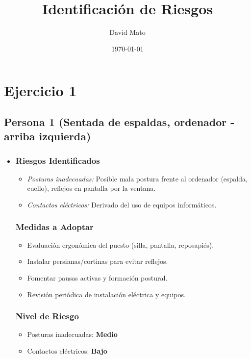 \documentclass[12pt,a4paper]{article}
\title{Identificación de Riesgos}
\author{David Mato}
\date{\today}
\begin{document}
	\setcounter{tocdepth}{2}
	\maketitle
	
	\tableofcontents
	
	\section{Ejercicio 1}
	
	\subsection{Persona 1 (Sentada de espaldas, ordenador - arriba izquierda)}
	\label{subsec:persona1} %
	
	\begin{itemize}
		\item \subsubsection{Riesgos Identificados}
		\begin{itemize}
			\item \textit{Posturas inadecuadas:} Posible mala postura frente al ordenador (espalda, cuello), reflejos en pantalla por la ventana.
			\item \textit{Contactos eléctricos:} Derivado del uso de equipos informáticos.
		\end{itemize}
		\subsubsection{Medidas a Adoptar}
		\begin{itemize}
			\item Evaluación ergonómica del puesto (silla, pantalla, reposapiés).
			\item Instalar persianas/cortinas para evitar reflejos.
			\item Fomentar pausas activas y formación postural.
			\item Revisión periódica de instalación eléctrica y equipos.
		\end{itemize}
		\subsubsection{Nivel de Riesgo}
		\begin{itemize}
			\item Posturas inadecuadas: \textbf{Medio}
			\item Contactos eléctricos: \textbf{Bajo}
		\end{itemize}
	\end{itemize}
	
\end{document}
